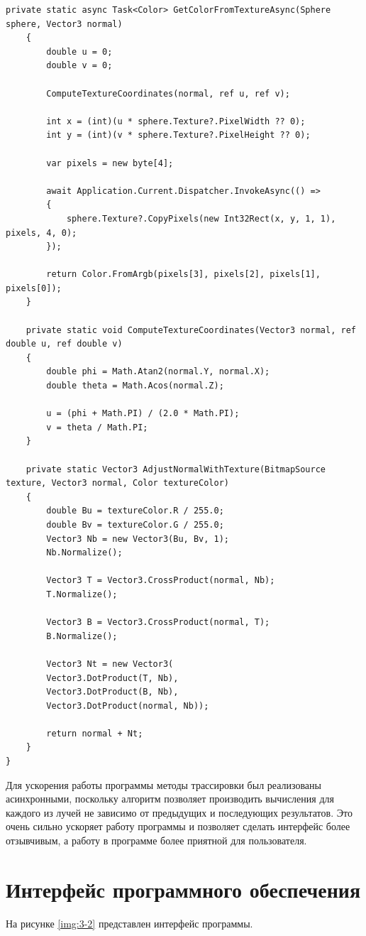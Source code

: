 \begin{lstlisting}[caption={Класс RayTracingService}, label={lst:3-5}]
	private static async Task<Color> GetColorFromTextureAsync(Sphere sphere, Vector3 normal)
	{
		double u = 0;
		double v = 0;
		
		ComputeTextureCoordinates(normal, ref u, ref v);
		
		int x = (int)(u * sphere.Texture?.PixelWidth ?? 0);
		int y = (int)(v * sphere.Texture?.PixelHeight ?? 0);
		
		var pixels = new byte[4];
		
		await Application.Current.Dispatcher.InvokeAsync(() =>
		{
			sphere.Texture?.CopyPixels(new Int32Rect(x, y, 1, 1), pixels, 4, 0);
		});
		
		return Color.FromArgb(pixels[3], pixels[2], pixels[1], pixels[0]);
	}
	
	private static void ComputeTextureCoordinates(Vector3 normal, ref double u, ref double v)
	{
		double phi = Math.Atan2(normal.Y, normal.X);
		double theta = Math.Acos(normal.Z);
		
		u = (phi + Math.PI) / (2.0 * Math.PI);
		v = theta / Math.PI;
	}
	
	private static Vector3 AdjustNormalWithTexture(BitmapSource texture, Vector3 normal, Color textureColor)
	{
		double Bu = textureColor.R / 255.0;
		double Bv = textureColor.G / 255.0;
		Vector3 Nb = new Vector3(Bu, Bv, 1);
		Nb.Normalize();
		
		Vector3 T = Vector3.CrossProduct(normal, Nb);
		T.Normalize();
		
		Vector3 B = Vector3.CrossProduct(normal, T);
		B.Normalize();
		
		Vector3 Nt = new Vector3(
		Vector3.DotProduct(T, Nb),
		Vector3.DotProduct(B, Nb),
		Vector3.DotProduct(normal, Nb));
		
		return normal + Nt;
	}
}
\end{lstlisting}

Для ускорения работы программы методы трассировки был реализованы асинхронными, поскольку алгоритм позволяет производить вычисления для каждого из лучей не зависимо от предыдущих и последующих результатов. Это очень сильно ускоряет работу программы и позволяет сделать интерфейс более отзывчивым, а работу в программе более приятной для пользователя.

\section{Интерфейс программного обеспечения}

На рисунке \ref{img:3-2} представлен интерфейс программы.

